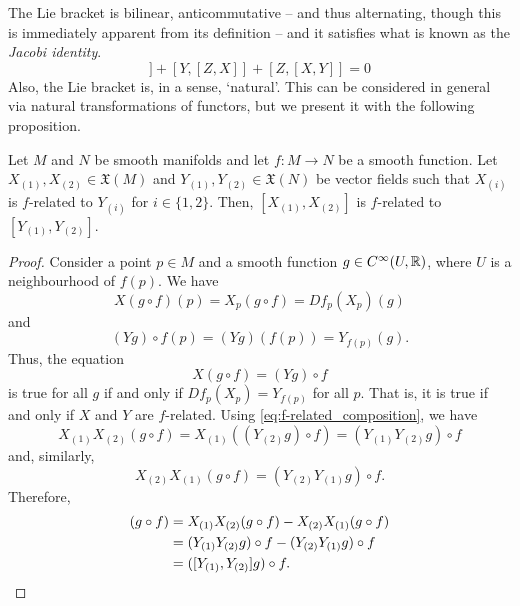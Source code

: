 \documentclass[a4paper,12pt]{article}
\begin{document}
The Lie bracket is bilinear, anticommutative -- and thus alternating, though this is immediately apparent from its definition -- and it satisfies what is known as the \emph{Jacobi identity}.
\begin{equation}
    [X, [Y, Z]] + [Y, [Z, X]] + [Z, [X, Y]] = 0
\end{equation}
Also, the Lie bracket is, in a sense, \enquote*{natural}.
This can be considered in general via natural transformations of functors, but we present it with the following proposition.
\begin{proposition}\label{prop:naturality_of_lie_bracket}
    Let $M$ and $N$ be smooth manifolds and let $f \colon M \to N$ be a smooth function.
    Let $X_{(1)}, X_{(2)} \in \mathfrak{X}(M)$ and $Y_{(1)}, Y_{(2)} \in \mathfrak{X}(N)$ be vector fields such that $X_{(i)}$ is $f$-related to $Y_{(i)}$ for $i \in \{1, 2\}$.
    Then, $[X_{(1)}, X_{(2)}]$ is $f$-related to $[Y_{(1)}, Y_{(2)}]$.
\end{proposition}
\begin{proof}
    Consider a point $p \in M$ and a smooth function $g \in C^\infty(U, \mathbb{R})$, where $U$ is a neighbourhood of $f(p)$.
    We have
    \begin{equation*}
        X(g \circ f)(p) = X_p(g \circ f) = Df_p(X_p)(g)
    \end{equation*}
    and
    \begin{equation*}
        (Yg) \circ f(p) = (Yg)(f(p)) = Y_{f(p)}(g).
    \end{equation*}
    Thus, the equation
    \begin{equation}\label{eq:f-related_composition}
        X(g \circ f) = (Yg) \circ f
    \end{equation}
    is true for all $g$ if and only if $Df_p(X_p) = Y_{f(p)}$ for all $p$.
    That is, it is true if and only if $X$ and $Y$ are $f$-related.
    Using \eqref{eq:f-related_composition}, we have
    \begin{equation*}
        X_{(1)}X_{(2)}(g \circ f) = X_{(1)}((Y_{(2)}g) \circ f) = (Y_{(1)}Y_{(2)}g) \circ f
    \end{equation*}
    and, similarly,
    \begin{equation*}
        X_{(2)}X_{(1)}(g \circ f) = (Y_{(2)}Y_{(1)}g) \circ f.
    \end{equation*}
    Therefore,
    \begin{align*}
        [X_{(1)}, X_{(2)}](g \circ f) &= X_{(1)} X_{(2)}(g \circ f) - X_{(2)} X_{(1)} (g \circ f) \\
        &= (Y_{(1)} Y_{(2)} g) \circ f - (Y_{(2)} Y_{(1)} g) \circ f \\
        &= ([Y_{(1)}, Y_{(2)}]g) \circ f. \qedhere
    \end{align*}
\end{proof}
\end{document}
